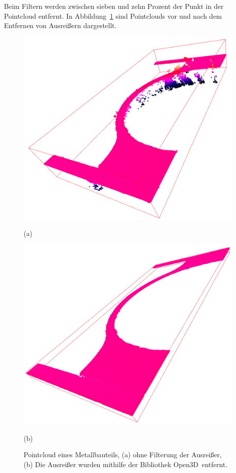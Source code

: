 Beim Filtern werden zwischen sieben und zehn Prozent der Punkt in der Pointcloud entfernt.
In Abbildung~\ref{fig:pcs} sind Pointclouds vor und nach dem Entfernen von Ausreißern 
dargestellt.

\begin{figure}[H]
    \centering
    \begin{minipage}{0.45\textwidth}
        \centering
        \includegraphics[width=\textwidth]{images/pc_with_outliers.PNG} %
        \caption*{(a)}
    \end{minipage}\hfill
    \begin{minipage}{0.45\textwidth}
        \centering
        \includegraphics[width=\textwidth]{images/pc_without_outliers.PNG} %
        \caption*{(b)}
    \end{minipage}
    \caption{Pointcloud eines Metallbauteils, (a) ohne Filterung der Ausreißer,
    (b) Die Ausreißer wurden mithilfe der Bibliothek \glqq Open3D\grqq~entfernt.}
    \label{fig:pcs}
\end{figure}


